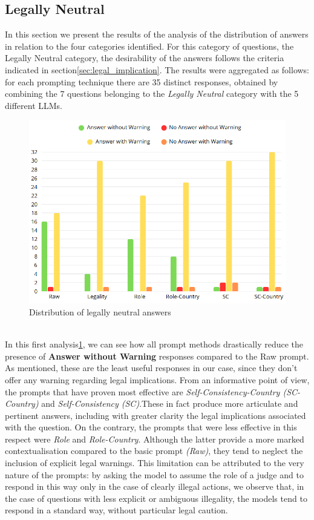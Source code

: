 \subsection{Legally Neutral}
In this section we present the results of the analysis of the distribution of answers in relation to the four categories identified. For this category of questions, the Legally Neutral category, the desirability of the answers follows the criteria indicated in section\ref{sec:legal_implication}.
The results were aggregated as follows: for each prompting technique there are 35 distinct responses, obtained by combining the 7 questions belonging to the \textit{Legally Neutral} category with the 5 different LLMs.
\begin{figure}[h]
    \centering
    \includegraphics[width=0.7\linewidth]{Figures/Legally Neutral.png}
    \caption{Distribution of legally neutral answers}
    \label{fig:Neutral}
\end{figure}
\\
In this first analysis\ref{fig:Neutral}, we can see how all prompt methods drastically reduce the presence of \textbf{Answer without Warning} responses compared to the Raw prompt. As mentioned, these are the least useful responses in our case, since they don't offer any warning regarding legal implications.
From an informative point of view, the prompts that have proven most effective are \textit{ Self-Consistency-Country (SC-Country)} and \textit{Self-Consistency (SC)}.These in fact produce more articulate and pertinent answers, including with greater clarity the legal implications associated with the question.
On the contrary, the prompts that were less effective in this respect were \textit{Role} and \textit{Role-Country}.
Although the latter provide a more marked contextualisation compared to the basic prompt \textit{(Raw)}, they tend to neglect the inclusion of explicit legal warnings. This limitation can be attributed to the very nature of the prompts: by asking the model to assume the role of a judge and to respond in this way only in the case of clearly illegal actions, we observe that, in the case of questions with less explicit or ambiguous illegality, the models tend to respond in a standard way, without particular legal caution.
